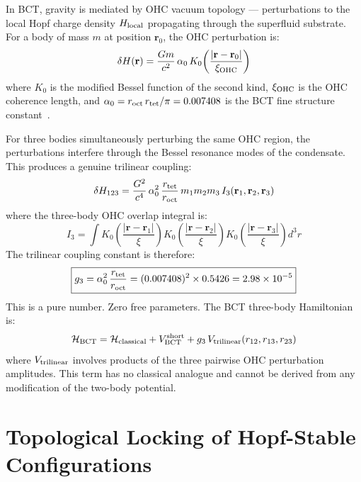 \documentclass[twocolumn,10pt]{article}
\begin{document}
In BCT, gravity is mediated by OHC vacuum topology --- perturbations to the local Hopf charge 
density $H_{\rm local}$ propagating through the superfluid substrate. For a body of mass $m$ 
at position $\mathbf{r}_0$, the OHC perturbation is:
%
\begin{equation}
\delta H(\mathbf{r}) = \frac{Gm}{c^2}\,\alpha_0\,K_0\!\left(\frac{|\mathbf{r}-\mathbf{r}_0|}{\xi_{\rm OHC}}\right)
\end{equation}
%
where $K_0$ is the modified Bessel function of the second kind, $\xi_{\rm OHC}$ is the OHC 
coherence length, and $\alpha_0 = r_{\rm oct}\,r_{\rm tet}/\pi = 0.007408$ is the BCT fine 
structure constant~\cite{bct_l1}.

For three bodies simultaneously perturbing the same OHC region, the perturbations interfere 
through the Bessel resonance modes of the condensate. This produces a genuine trilinear 
coupling:
%
\begin{equation}
\delta H_{123} = \frac{G^2}{c^4}\,\alpha_0^2\,\frac{r_{\rm tet}}{r_{\rm oct}}\,
m_1 m_2 m_3\,I_3(\mathbf{r}_1,\mathbf{r}_2,\mathbf{r}_3)
\end{equation}
%
where the three-body OHC overlap integral is:
%
\begin{equation}
I_3 = \int K_0\!\left(\frac{|\mathbf{r}-\mathbf{r}_1|}{\xi}\right)
K_0\!\left(\frac{|\mathbf{r}-\mathbf{r}_2|}{\xi}\right)
K_0\!\left(\frac{|\mathbf{r}-\mathbf{r}_3|}{\xi}\right)d^3r
\end{equation}
%
The trilinear coupling constant is therefore:
%
\begin{equation}
\boxed{g_3 = \alpha_0^2\,\frac{r_{\rm tet}}{r_{\rm oct}} = (0.007408)^2 \times 0.5426 
= 2.98\times10^{-5}}
\end{equation}
%
This is a pure number. Zero free parameters. The BCT three-body Hamiltonian is:
%
\begin{equation}
\mathcal{H}_{\rm BCT} = \mathcal{H}_{\rm classical} + V_{\rm BCT}^{\rm short} 
+ g_3\,V_{\rm trilinear}(r_{12},r_{13},r_{23})
\end{equation}
%
where $V_{\rm trilinear}$ involves products of the three pairwise OHC perturbation amplitudes. 
This term has no classical analogue and cannot be derived from any modification of the 
two-body potential.

\section{Topological Locking of Hopf-Stable Configurations}
\end{document}
